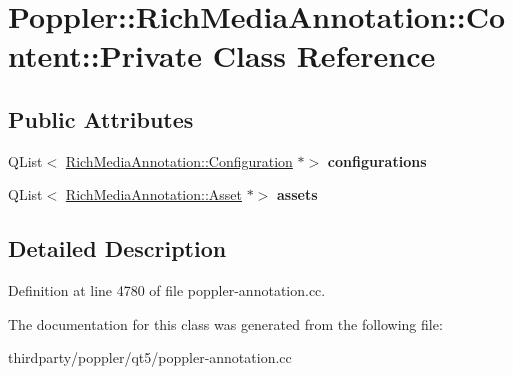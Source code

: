 \hypertarget{class_poppler_1_1_rich_media_annotation_1_1_content_1_1_private}{}\section{Poppler\+:\+:Rich\+Media\+Annotation\+:\+:Content\+:\+:Private Class Reference}
\label{class_poppler_1_1_rich_media_annotation_1_1_content_1_1_private}
\subsection*{Public Attributes}
\begin{DoxyCompactItemize}
\item 
\mbox{\label{class_poppler_1_1_rich_media_annotation_1_1_content_1_1_private_aa3074c83e434586cf6f3348c17466182}} 
Q\+List$<$ \hyperlink{class_poppler_1_1_rich_media_annotation_1_1_configuration}{Rich\+Media\+Annotation\+::\+Configuration} $\ast$$>$ {\bfseries configurations}
\item 
\mbox{\label{class_poppler_1_1_rich_media_annotation_1_1_content_1_1_private_a42817a4d4f7acf10b58121422452f27a}} 
Q\+List$<$ \hyperlink{class_poppler_1_1_rich_media_annotation_1_1_asset}{Rich\+Media\+Annotation\+::\+Asset} $\ast$$>$ {\bfseries assets}
\end{DoxyCompactItemize}


\subsection{Detailed Description}


Definition at line 4780 of file poppler-\/annotation.\+cc.



The documentation for this class was generated from the following file\+:\begin{DoxyCompactItemize}
\item 
thirdparty/poppler/qt5/poppler-\/annotation.\+cc\end{DoxyCompactItemize}
